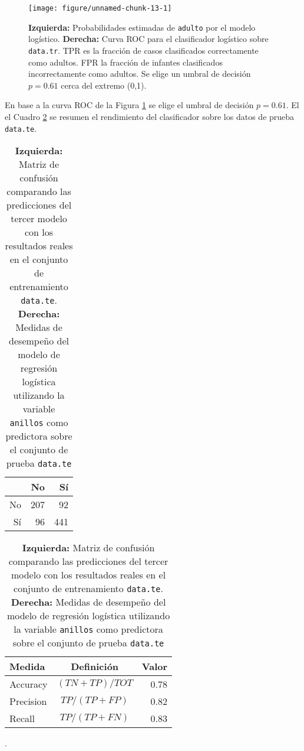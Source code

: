 \documentclass[a4paper]{article}\usepackage[]{graphicx}\usepackage[]{color}
\makeatletter
\def\maxwidth{ %
  \ifdim\Gin@nat@width>\linewidth
    \linewidth
  \else
    \Gin@nat@width
  \fi
}
\newenvironment{knitrout}{}{} %
\makeatother
\begin{document}
\begin{figure}[t]
\begin{knitrout}
\color{fgcolor}

{\centering \texttt{[image: figure/unnamed-chunk-13-1]} 

}



\end{knitrout}
\caption{\textbf{Izquierda:} Probabilidades estimadas de \texttt{\textcolor{BurntOrange}{adulto}} por el modelo logístico. \textbf{Derecha:} Curva ROC para el clasificador logístico sobre \texttt{\textcolor{BurntOrange}{data.tr}}. TPR es la fracción de casos clasificados correctamente como adultos. FPR la fracción de infantes clasificados incorrectamente como adultos. Se elige un umbral de decisión $p=0.61$ cerca del extremo (0,1).}
\label{fig:model3}
\end{figure}


En base a la curva ROC de la Figura \ref{fig:model3} se elige el umbral de decisión $p=0.61$. El el Cuadro \ref{tab:medidas3} se resumen el rendimiento del clasificador sobre los datos de prueba \texttt{\textcolor{BurntOrange}{data.te}}.




\begin{table}[h]
\centering
\begin{tabular}{rrr}
  \hline
 & No & Sí \\ 
  \hline
No & 207 &  92 \\ 
  Sí &  96 & 441 \\ 
   \hline
\end{tabular}
\hspace{4cm}
\begin{tabular}{l c r}
\hline
Medida 				& Definición		& Valor\\
\hline
Accuracy 			& $(TN+TP)/TOT$ & 0.78\\
Precision 			& $TP/(TP+FP)$  &  0.82\\
Recall 				& $TP/(TP+FN)$  & 0.83\\
\hline
\end{tabular}
\caption{\textbf{Izquierda:} Matriz de confusión comparando las predicciones del tercer modelo con los resultados reales en el conjunto de entrenamiento \texttt{\textcolor{BurntOrange}{data.te}}. \textbf{Derecha:} Medidas de desempeño del modelo de regresión logística utilizando la variable \texttt{\textcolor{BurntOrange}{anillos}} como predictora sobre el conjunto de prueba \texttt{\textcolor{BurntOrange}{data.te}}}.
\label{tab:medidas3}
\end{table}
\end{document}
